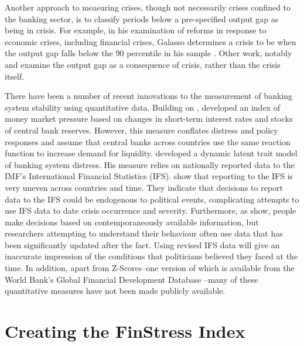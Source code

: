 \documentclass[]{article}
\begin{document}
Another approach to measuring crises, though not necessarily crises confined to the banking sector, is to classify periods below a pre-specified output gap as being in crisis. For example, in his examination of reforms in response to economic crises, including financial crises, Galasso determines a crisis to be when the output gap falls below the 90 percentile in his sample \citeyearpar[154]{galasso2014}. Other work, notably \cite{laeven2013} and \cite{Reinhart2009} examine the output gap as a consequence of crisis, rather than the crisis itself.

There have been a number of recent innovations to the measurement of banking system stability using quantitative data. Building on \cite{vonHagen2007}, \cite{Jing2015} developed an index of money market pressure based on changes in short-term interest rates and stocks of central bank reserves. However, this measure conflates distress and policy responses and assume that central banks across countries use the same reaction function to increase demand for liquidity. \cite{Rosas2009} developed a dynamic latent trait model of banking system distress. His measure relies on nationally reported data to the IMF's International Financial Statistics (IFS). \cite{GandrudCopHal2015} show that reporting to the IFS is very uneven across countries and time. They indicate that decisions to report data to the IFS could be endogenous to political events, complicating attempts to use IFS data to date crisis occurrence and severity. Furthermore, as \cite{KayserLeininger2015} show, people make decisions based on contemporaneously available information, but researchers attempting to understand their behaviour often use data that has been significantly updated after the fact. Using revised IFS data will give an inaccurate impression of the conditions that politicians believed they faced at the time. In addition, apart from Z-Scores--one version of which is available from the World Bank's Global Financial Development Database \citep{worldbank2013}--many of these quantitative measures have not been made publicly available.

\section{Creating the FinStress Index}
\end{document}
